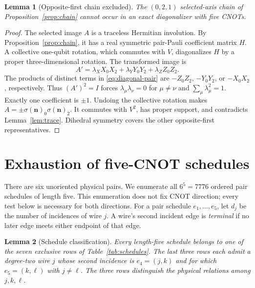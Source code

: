 \documentclass[11pt]{article}
\newtheorem{lemma}{Lemma}
\begin{document}
\begin{lemma}[Opposite-first chain excluded]\label{lem:opposite-chain}
The $(0,2,1)$ selected-axis chain of Proposition~\ref{prop:chain}
cannot occur in an exact diagonalizer with five CNOTs.
\end{lemma}

\begin{proof}
The selected image $A$ is a traceless Hermitian involution.  By
Proposition~\ref{prop:chain}, it has a real symmetric pair-Pauli
coefficient matrix $H$.  A collective one-qubit rotation, which
commutes with $V$, diagonalizes $H$ by a proper three-dimensional
rotation.  The transformed image is
\begin{equation}\label{eq:diagonal-pair}
A'=\lambda_X X_0X_2+\lambda_Y Y_0Y_2+\lambda_Z Z_0Z_2.
\end{equation}
The products of distinct terms in \eqref{eq:diagonal-pair} are
$-Z_0Z_2$, $-Y_0Y_2$, or $-X_0X_2$, respectively.  Thus $(A')^2=I$
forces $\lambda_\mu\lambda_\nu=0$ for $\mu\ne\nu$ and
$\sum_\mu\lambda_\mu^2=1$.  Exactly one coefficient is $\pm1$.
Undoing the collective rotation makes
$A=\pm\sigma(\mathbf n)_0\sigma(\mathbf n)_2$.
It commutes with $V^2$, has proper support, and contradicts
Lemma~\ref{lem:trace}.  Dihedral symmetry covers the other
opposite-first representatives.
\end{proof}

\section{Exhaustion of five-CNOT schedules}

There are six unoriented physical pairs.  We enumerate all $6^5=7776$
ordered pair schedules of length five.  This enumeration does not fix
CNOT direction; every test below is necessary for both directions.
For a pair schedule $e_1,\ldots,e_5$, let $d_j$ be the number of
incidences of wire $j$.  A wire's second incident edge is
\emph{terminal} if no later edge meets either endpoint of that edge.

\begin{lemma}[Schedule classification]\label{lem:enumeration}
Every length-five schedule belongs to one of the seven exclusive rows of
Table~\ref{tab:schedules}.  The last three rows each admit a degree-two
wire $j$ whose second incidence is $e_4=(j,k)$ and for which
$e_5=(k,\ell)$ with $j\ne\ell$.  The three rows distinguish the
physical relations among $j,k,\ell$.
\end{lemma}
\end{document}
